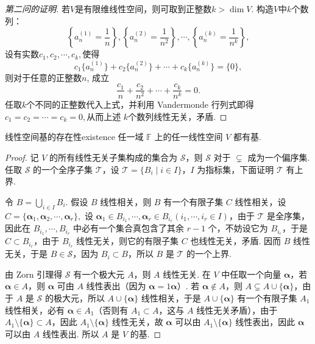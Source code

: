 \documentclass[12pt, a4paper,newtx]{ctexart}
\begin{document}
\begin{proof}[第二问的证明]
	若$V$是有限维线性空间，则可取到正整数$k > \dim V$. 构造$V$中$k$个数列：
	\[
	\left\{a_n^{(1)} = \frac{1}{n}\right\}, \left\{a_n^{(2)} = \frac{1}{n^2}\right\}, \cdots, \left\{a_n^{(k)} = \frac{1}{n^k}\right\},
	\]
	设有实数$c_1, c_2, \cdots, c_k, $使得
	\[
	c_1\{a_n^{(1)}\} + c_2\{a_n^{(2)}\} + \cdots + c_k\{a_n^{(k)}\} = \{0\},
	\]
	则对于任意的正整数$n$, 成立	\[
	\frac{c_1}{n} + \frac{c_2}{n^2} + \cdots + \frac{c_k}{n^k} = 0.
	\]
	任取$k$个不同的正整数代入上式，并利用 Vandermonde 行列式即得$c_1 = c_2 = \cdots = c_k = 0, $从而上述 $k$个数列线性无关，矛盾. 
\end{proof}
\begin{theorem}{线性空间基的存在性}{existence}
	任一域 $\mathbb F$ 上的任一线性空间 $V$ 都有基. 
\end{theorem}
\begin{proof}
	记 $V$ 的所有线性无关子集构成的集合为 $\mathscr{S}$，则 $\mathscr{S}$ 对于 $\subsetneq$ 成为一个偏序集. 任取 $\mathscr{S}$ 的一个全序子集 $\mathscr{T}$，设 $\mathscr{T} = \{B_i \mid i \in I\}$，$I$ 为指标集，下面证明 $\mathscr{T}$ 有上界. 
	
	令 $\displaystyle B = \bigcup_{i \in I} B_i$. 假设 $B$ 线性相关，则 $B$ 有一个有限子集 $C$ 线性相关，设
	$ C = \{\bm \alpha_1, \bm \alpha_2, \cdots, \bm\alpha_r\}, $
	设 $\bm \alpha_1 \in B_{i_1}, \cdots, \bm \alpha_r \in B_{i_r} (i_1, \cdots, i_r \in I)$，由于 $\mathscr{T}$ 是全序集，因此在 $B_{i_1}, \cdots, B_{i_r}$ 中必有一个集合真包含了其余 $r - 1$ 个，不妨设它为 $B_{i_r}$，于是 $C \subset B_{i_r}$，由于 $B_{i_r}$ 线性无关，则它的有限子集 $C$ 也线性无关，矛盾. 因而 $B$ 线性无关，于是 $B \in \mathscr{S}$，因为 $B_i \subset B$，所以 $B$ 是 $\mathscr{T}$ 的一个上界. 
	
	由 Zorn 引理得 $\mathscr{S}$ 有一个极大元 $A$，则 $A$ 线性无关. 在 $V$ 中任取一个向量 $\bm \alpha$，若 $\bm\alpha \in A$，则 $\bm\alpha$ 可由 $A$ 线性表出（因为 $\bm\alpha = 1\bm\alpha$）. 若 $\bm\alpha \notin A$，则 $A \subsetneq A \cup \{\bm\alpha\}$，由于 $A$ 是 $\mathscr{S}$ 的极大元，所以 $A \cup \{\bm\alpha\}$ 线性相关，于是 $A \cup \{\bm\alpha\}$ 有一个有限子集 $A_1$ 线性相关，必有 $\bm\alpha \in A_1$（否则有 $A_1 \subset A$，这与 $A$ 线性无关矛盾），由于 $A_1 \setminus \{\bm\alpha\} \subset A$，因此 $A_1 \setminus \{\bm\alpha\}$ 线性无关，故 $\bm\alpha$ 可以由 $A_1 \setminus \{\bm\alpha\}$ 线性表出，因此 $\bm\alpha$ 可以由 $A$ 线性表出. 所以 $A$ 是 $V$ 的基. 
\end{proof}
\end{document}
